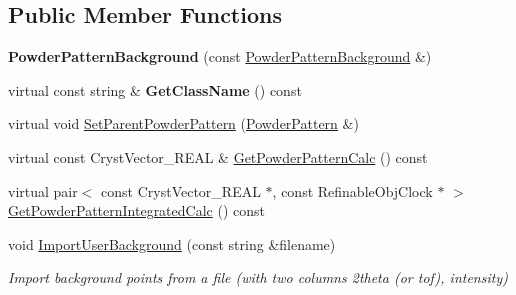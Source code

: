 \subsection*{Public Member Functions}
\begin{DoxyCompactItemize}
\item 
\mbox{\label{class_obj_cryst_1_1_powder_pattern_background_a46496ee29e07d0c8949bfc45d77a4c3e}} 
{\bfseries Powder\+Pattern\+Background} (const \mbox{\hyperlink{class_obj_cryst_1_1_powder_pattern_background}{Powder\+Pattern\+Background}} \&)
\item 
\mbox{\label{class_obj_cryst_1_1_powder_pattern_background_a89fbd665d405103dc4ba72845e1f04a2}} 
virtual const string \& {\bfseries Get\+Class\+Name} () const
\item 
virtual void \mbox{\hyperlink{class_obj_cryst_1_1_powder_pattern_background_a74b0128b9f2c6be0302f67e132ed4aed}{Set\+Parent\+Powder\+Pattern}} (\mbox{\hyperlink{class_obj_cryst_1_1_powder_pattern}{Powder\+Pattern}} \&)
\item 
virtual const Cryst\+Vector\+\_\+\+R\+E\+AL \& \mbox{\hyperlink{class_obj_cryst_1_1_powder_pattern_background_aeff3379aae4bd4ff3d6ff353ce8f7f96}{Get\+Powder\+Pattern\+Calc}} () const
\item 
virtual pair$<$ const Cryst\+Vector\+\_\+\+R\+E\+AL $\ast$, const Refinable\+Obj\+Clock $\ast$ $>$ \mbox{\hyperlink{class_obj_cryst_1_1_powder_pattern_background_add12004ddfd2cc22d4fe0c52304da709}{Get\+Powder\+Pattern\+Integrated\+Calc}} () const
\item 
\mbox{\label{class_obj_cryst_1_1_powder_pattern_background_ae68fc3a9883ca45c81a22119c28d9379}} 
void \mbox{\hyperlink{class_obj_cryst_1_1_powder_pattern_background_ae68fc3a9883ca45c81a22119c28d9379}{Import\+User\+Background}} (const string \&filename)
\begin{DoxyCompactList}\small\item\em Import background points from a file (with two columns 2theta (or tof), intensity) \end{DoxyCompactList}\item 
\mbox{\label{class_obj_cryst_1_1_powder_pattern_background_afda9ea065efbed3fcfc783060de9b415}} 

\end{DoxyCompactItemize}

